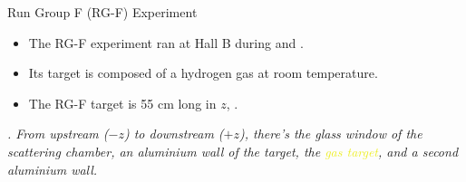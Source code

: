 \begin{frame}{Run Group F (RG-F) Experiment}
    \label{10.41::rgf_experiment}

    \begin{itemize}
        \item
            The RG-F experiment ran at Hall B during  and .

        \vspace{12pt}
        \item
            Its target is composed of a hydrogen gas at room temperature.

        \vspace{12pt}
        \item
            The RG-F target is 55 cm long in $z$, .
    \end{itemize}

    \vspace{-6pt}

    \begin{center}
        \begin{figure}[t]
        \end{figure}
    \end{center}

    \vspace{-6pt}

    \scriptsize{\textit{
        .
        From upstream ($-z$) to downstream ($+z$), there's the glass window of the scattering chamber, an aluminium wall of the target, the \textcolor[HTML]{edee23}{gas target}, and a second aluminium wall.
    }}
\end{frame}
